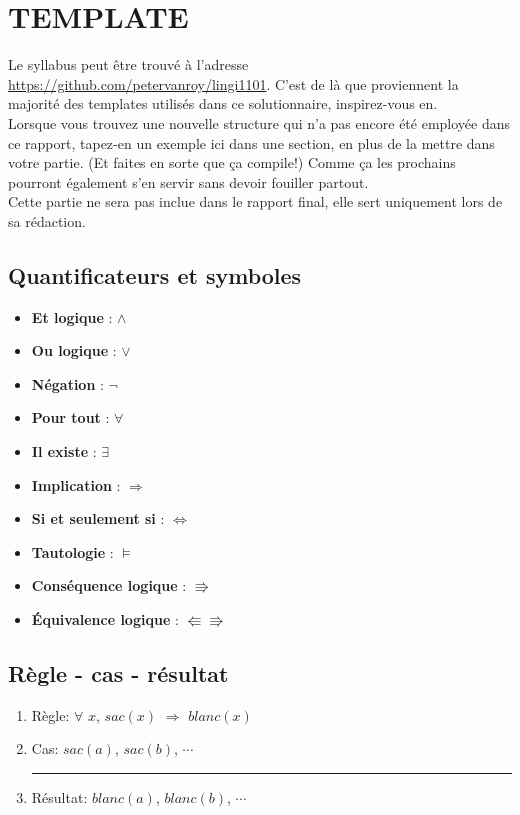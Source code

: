 \section*{TEMPLATE}
Le syllabus peut être trouvé à l'adresse \url{https://github.com/petervanroy/lingi1101}.
C'est de là que proviennent la majorité des templates utilisés dans ce solutionnaire, inspirez-vous en.\\
Lorsque vous trouvez une nouvelle structure qui n'a pas encore été employée dans ce rapport, tapez-en un exemple ici dans une section, en plus de la mettre dans votre partie.
(Et faites en sorte que ça compile!)
Comme ça les prochains pourront également s'en servir sans devoir fouiller partout.\\
Cette partie ne sera pas inclue dans le rapport final, elle sert uniquement lors de sa rédaction.

\subsection*{Quantificateurs et symboles}
\begin{itemize}
    \item \textbf{Et logique} : $\land$
    \item \textbf{Ou logique} : $\lor$
    \item \textbf{Négation} : $\neg$
    \item \textbf{Pour tout} : $\forall$
    \item \textbf{Il existe} : $\exists$
    \item \textbf{Implication} : $\Rightarrow$
    \item \textbf{Si et seulement si} : $\Leftrightarrow$
    \item \textbf{Tautologie} : $\models$
    \item \textbf{Conséquence logique} : $\Rrightarrow$
    \item \textbf{Équivalence logique} : $\Lleftarrow \Rrightarrow$
\end{itemize}


\subsection*{Règle - cas - résultat}
\begin{enumerate}
  \item Règle: $\forall$ $x$, $sac(x)$ $\Rightarrow$ $blanc(x)$
  \item Cas: $sac(a)$, $sac(b)$, $\cdots$\\
  \rule{5.5cm}{.1pt} 
  \item Résultat: $blanc(a)$, $blanc(b)$, $\cdots$
\end{enumerate}

